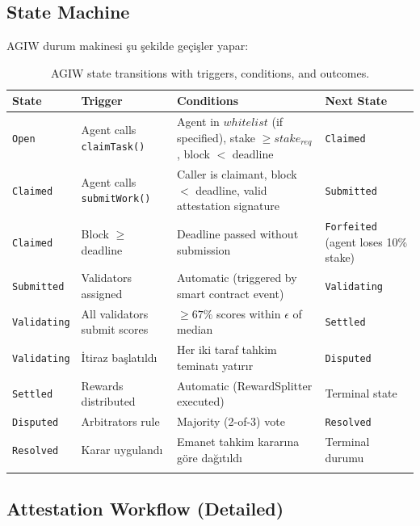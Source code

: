 \documentclass[11pt]{article}
\begin{document}
\begin{itemize}[noitemsep]
\begin{itemize}[noitemsep]
\begin{itemize}[noitemsep]
\begin{itemize}[noitemsep]
\begin{itemize}[noitemsep]
\begin{itemize}[noitemsep]
\begin{itemize}[noitemsep]
\begin{enumerate}[noitemsep]
\subsection{State Machine}
\label{sec:agiw-state-machine}
AGIW durum makinesi şu şekilde geçişler yapar:
\begin{longtable}{@{}p{}p{}p{}p{}@{}}
\toprule
\textbf{State} & \textbf{Trigger} & \textbf{Conditions} & \textbf{Next State} \\\midrule
\texttt{Open} & Agent calls \texttt{claimTask()} & Agent in $whitelist$ (if specified), stake $\geq stake_{req}$, block $<$ deadline & \texttt{Claimed} \\
\texttt{Claimed} & Agent calls \texttt{submitWork()} & Caller is claimant, block $<$ deadline, valid attestation signature & \texttt{Submitted} \\
\texttt{Claimed} & Block $\geq$ deadline & Deadline passed without submission & \texttt{Forfeited} (agent loses 10\% stake) \\
\texttt{Submitted} & Validators assigned & Automatic (triggered by smart contract event) & \texttt{Validating} \\
\texttt{Validating} & All validators submit scores & $\geq 67\%$ scores within $\epsilon$ of median & \texttt{Settled} \\
\texttt{Validating} & İtiraz başlatıldı & Her iki taraf tahkim teminatı yatırır & \texttt{Disputed} \\
\texttt{Settled} & Rewards distributed & Automatic (RewardSplitter executed) & Terminal state \\
\texttt{Disputed} & Arbitrators rule & Majority (2-of-3) vote & \texttt{Resolved} \\
\texttt{Resolved} & Karar uygulandı & Emanet tahkim kararına göre dağıtıldı & Terminal durumu \\\bottomrule
\caption{AGIW state transitions with triggers, conditions, and outcomes.}
\label{tab:agiw-states}
\end{longtable}

\subsection{Attestation Workflow (Detailed)}
\label{sec:attestation-workflow}

\end{enumerate}
\end{itemize}
\end{itemize}
\end{itemize}
\end{itemize}
\end{itemize}
\end{itemize}
\end{itemize}
\end{document}
